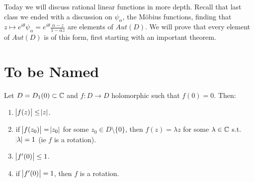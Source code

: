 \setcounter{section}{0}
\setcounter{theorem}{0}



Today we will discuss rational linear functions in more depth. Recall that last class we ended with a discussion on $\psi_\alpha$, the M{\"o}bius functions, finding that $z \mapsto e^{i \theta} \psi_\alpha = e^{i \theta} \frac{\alpha - z}{ 1 - \overline{\alpha} z}$ are elements of $Aut(D)$. We will prove that every element of $Aut(D)$ is of this form, first starting with an important theorem.

\section{To be Named}

\begin{theorem}\label{thm:schwarz-lemma}
Let $D = D_1(0) \subset \mathbb{C}$ and $f: D \to D$ holomorphic such that $f(0) = 0$. Then:
\begin{enumerate}
    \item $\abs{f(z)} \leq \abs{z}$.
    \item if $\abs{f(z_0)} = \abs{z_0}$ for some $z_0 \in D \setminus \{ 0 \}$, then $f (z) = \lambda z$ for some $\lambda \in \mathbb{C}$ s.t. $\abs{\lambda} = 1$ (ie $f$ is a rotation).
    \item  $\abs{f'(0)} \leq 1$.
    \item if $\abs{f'(0)} = 1$, then $f$ is a rotation.
\end{enumerate}


\end{theorem}







